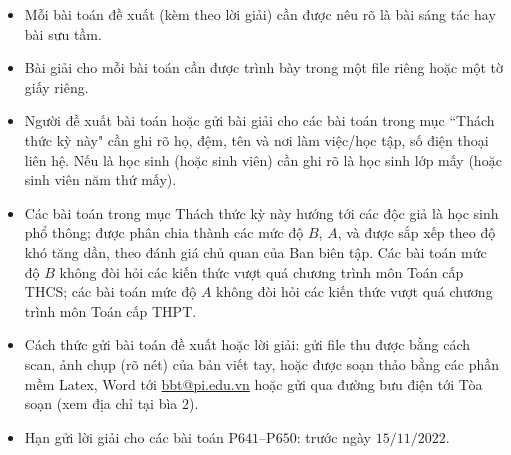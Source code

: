 \thispagestyle{thachthuctoanhocnone}
\pagestyle{thachthuctoanhoc}
\everymath{\color{thachthuctoanhoc}}
\graphicspath{{../thachthuctoanhoc/pic/}}
\begingroup
{}
\centering
\vspace*{4cm}
\endgroup
\vspace*{-8pt}
\begin{tBox}
	\begin{itemize}[leftmargin = 13pt, itemsep = 1.0pt] 
				\item Mỗi bài toán đề xuất (kèm theo lời giải) cần được nêu rõ là bài sáng tác hay bài sưu tầm.
		\item Bài giải cho mỗi bài toán cần được trình bày trong một file riêng hoặc
		một tờ giấy riêng.
		\item  Người đề xuất bài toán hoặc gửi bài giải cho các bài toán trong mục ``Thách thức kỳ này" cần ghi rõ họ, đệm, tên và nơi làm việc/học tập, số điện thoại liên hệ. Nếu là học sinh (hoặc sinh viên) cần ghi rõ là học sinh lớp mấy (hoặc sinh viên năm thứ mấy).
		\item Các bài toán trong mục Thách thức kỳ này hướng tới các độc giả là học sinh phổ thông; được phân chia thành các mức độ $B$, $A$, và được sắp xếp theo độ khó tăng dần, theo đánh giá chủ quan của Ban biên tập. Các bài toán mức độ $B$ không đòi hỏi các kiến thức vượt quá chương trình môn Toán cấp THCS; các bài toán mức độ $A$ không đòi hỏi các kiến thức vượt quá chương trình môn Toán cấp THPT.
		\item Cách thức gửi bài toán đề xuất hoặc lời giải: gửi file thu được bằng cách scan, ảnh chụp (rõ nét) của bản viết tay, hoặc được soạn thảo bằng các phần mềm Latex, Word tới \url{bbt@pi.edu.vn} hoặc gửi qua đường bưu điện tới Tòa soạn (xem địa chỉ tại bìa $2$).
		\item Hạn gửi lời giải cho các bài toán P$641$--P$650$: trước ngày $15/11/2022$.
	\end{itemize}
\end{tBox}
